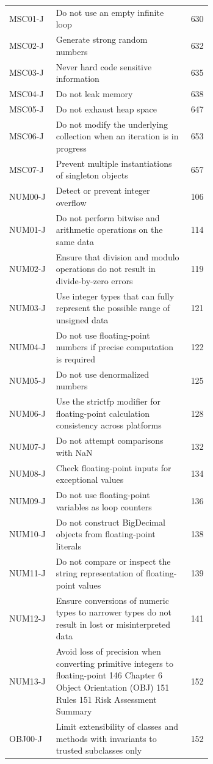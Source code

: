 \documentclass[11pt]{report}
\begin{document}
\begin{longtable}{@{}l>{\raggedright\arraybackslash}p{0.66\linewidth}r@{}}
MSC01-J & Do not use an empty infinite loop & 630\\
MSC02-J & Generate strong random numbers & 632\\
MSC03-J & Never hard code sensitive information & 635\\
MSC04-J & Do not leak memory & 638\\
MSC05-J & Do not exhaust heap space & 647\\
MSC06-J & Do not modify the underlying collection when an iteration is in progress & 653\\
MSC07-J & Prevent multiple instantiations of singleton objects & 657\\
NUM00-J & Detect or prevent integer overflow & 106\\
NUM01-J & Do not perform bitwise and arithmetic operations on the same data & 114\\
NUM02-J & Ensure that division and modulo operations do not result in divide-by-zero errors & 119\\
NUM03-J & Use integer types that can fully represent the possible range of unsigned data & 121\\
NUM04-J & Do not use floating-point numbers if precise computation is required & 122\\
NUM05-J & Do not use denormalized numbers & 125\\
NUM06-J & Use the strictfp modifier for floating-point calculation consistency across platforms & 128\\
NUM07-J & Do not attempt comparisons with NaN & 132\\
NUM08-J & Check floating-point inputs for exceptional values & 134\\
NUM09-J & Do not use floating-point variables as loop counters & 136\\
NUM10-J & Do not construct BigDecimal objects from floating-point literals & 138\\
NUM11-J & Do not compare or inspect the string representation of floating-point values & 139\\
NUM12-J & Ensure conversions of numeric types to narrower types do not result in lost or misinterpreted data & 141\\
NUM13-J & Avoid loss of precision when converting primitive integers to floating-point 146 Chapter 6 Object Orientation (OBJ) 151 Rules 151 Risk Assessment Summary & 152\\
OBJ00-J & Limit extensibility of classes and methods with invariants to trusted subclasses only & 152\\

\end{longtable}
\end{document}
